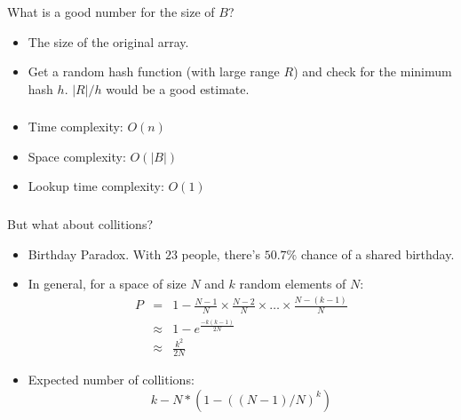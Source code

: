 \documentclass[table]{beamer}
\makeatletter
\newcommand*{\currentname}{\@currentlabelname}
\makeatother
\begin{document}
\begin{frame}
    \frametitle{\currentname}
    What is a good number for the size of $B$?
    \pause
    \begin{itemize}
        \item The size of the original array.
        \pause
        \item Get a random hash function (with large range $R$) and check for the minimum hash $h$. $|R|/h$ would be a good estimate.
    \end{itemize}
    \begin{center}
    \end{center}
\end{frame}

\begin{frame}
    \frametitle{\currentname}
        \begin{itemize}
            \item Time complexity: $O(n)$
            \item Space complexity: $O(|B|)$
            \item Lookup time complexity: $O(1)$
        \end{itemize}
\end{frame}

\begin{frame}
    \frametitle{\currentname}
    But what about collitions?
    \begin{itemize}
        \item Birthday Paradox. With $23$ people, there's $50.7\%$ chance of a shared birthday.
        \item In general, for a space of size $N$ and $k$ random elements of $N$:
            \[\begin{array}{cCc}
            P & = & 1 - \frac{N-1}{N} \times \frac{N-2}{N} \times \ldots \times \frac{N-(k-1)}{N}\\
            & \approx & 1 - e ^ {\frac{-k(k-1)}{2N}}\\
            & \approx & \frac{k^2}{2N}
            \end{array}\]
        \item Expected number of collitions:
            \[
                k - N * (1 - ((N-1)/N)^k)
            \]
    \end{itemize}
\end{frame}
\end{document}
